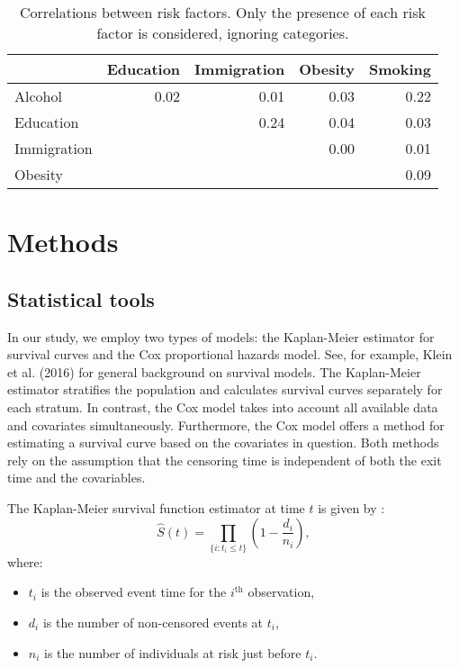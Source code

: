 \documentclass{article}
\begin{document}
\begin{table}\begin{longtable}{l|rrrr}
\caption{
\label{tab:fdr_cor}Correlations between risk factors.
        Only the presence of each risk factor is considered, ignoring
        categories.
} \\ 
\toprule
\multicolumn{1}{l}{} & Education & Immigration & Obesity & Smoking \\ 
\midrule
Alcohol & 0.02 & 0.01 & 0.03 & 0.22 \\ 
Education &  & 0.24 & 0.04 & 0.03 \\ 
Immigration &  &  & 0.00 & 0.01 \\ 
Obesity &  &  &  & 0.09 \\ 
\bottomrule
\end{longtable}
\end{table}

\hypertarget{methods}{%
\section{\texorpdfstring{Methods
\label{sec:stat_methods}}{Methods }}\label{methods}}

\hypertarget{statistical-tools}{%
\subsection{Statistical tools}\label{statistical-tools}}

In our study, we employ two types of models: the Kaplan-Meier estimator
for survival curves and the Cox proportional hazards model. See, for
example, Klein et al. (2016) for general background on survival models.
The Kaplan-Meier estimator stratifies the population and calculates
survival curves separately for each stratum. In contrast, the Cox model
takes into account all available data and covariates simultaneously.
Furthermore, the Cox model offers a method for estimating a survival
curve based on the covariates in question. Both methods rely on the
assumption that the censoring time is independent of both the exit time
and the covariables.

The Kaplan-Meier survival function estimator at time \(t\) is given by :
\begin{equation}
\hat{S}(t) = \prod_{\{i:t_i \leq t\}} \left(1 - \frac{d_i}{n_i}\right),
\end{equation} where:

\begin{itemize}
  \item $t_i$ is the observed event time for the $i^\text{th}$ observation,
  \item $d_i$ is the number of non-censored events at $t_i$,
  \item $n_i$ is the number of individuals at risk just before $t_i$.
\end{itemize}
\end{document}

